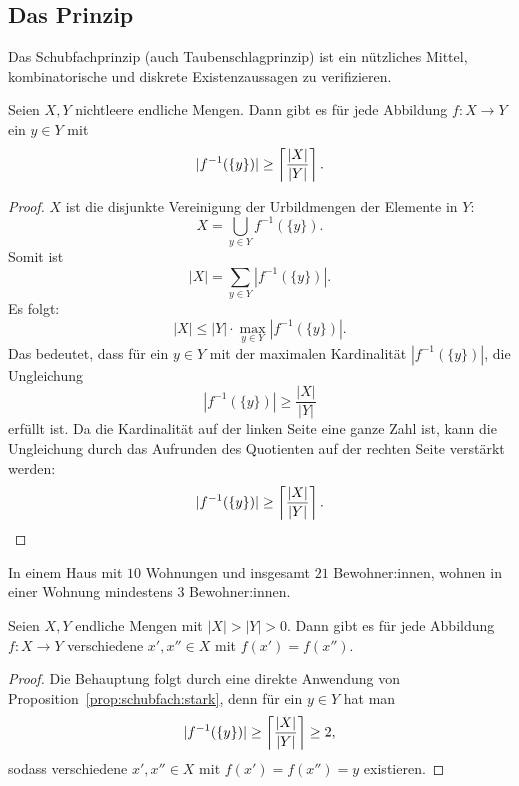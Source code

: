\subsection{Das Prinzip} 

\begin{bem}
	Das Schubfachprinzip (auch Taubenschlagprinzip) ist ein nützliches Mittel, kombinatorische und diskrete  Existenzaussagen zu verifizieren. 
\end{bem} 


\begin{prop} \label{prop:schubfach:stark}
	Seien $X, Y$ nichtleere endliche Mengen. Dann gibt es für jede Abbildung $f: X \to Y$ ein $y \in Y$ mit 
	\[
		|f^{-1} (\{y\})|  \ge  \left\lceil \frac{|X|}{|Y|} \right\rceil .
	\]
\end{prop} 
\begin{proof} $X$ ist die disjunkte Vereinigung der Urbildmengen der Elemente in $Y$:
	\[
			X = \bigcup_{y \in Y} f^{-1}(\{y\}) .
	\]
	Somit ist 
	\[
		|X| = \sum_{y \in Y} | f^{-1}(\{y\}) | .
	\]
	Es folgt: 
	\[
		|X| \le |Y| \cdot \max_{y \in Y} |f^{-1}(\{y\}) |. 
	\]
	Das bedeutet, dass für ein $y \in Y$ mit der maximalen Kardinalität $|f^{-1}(\{y\}) |$, die Ungleichung 
	\[
			|f^{-1}(\{y\})| \ge \frac{|X|}{|Y|}
	\]
	erfüllt ist. Da die Kardinalität auf der linken Seite eine ganze Zahl ist, kann die Ungleichung durch das Aufrunden des Quotienten auf der rechten Seite verstärkt werden: 
	\[
			|f^{-1}(\{y\})| \ge \left\lceil \frac{|X|}{|Y|} \right\rceil.
	\]
\end{proof} 


\begin{bsp}
	In einem Haus mit $10$ Wohnungen und insgesamt $21$ Bewohner:innen, wohnen in einer Wohnung mindestens $3$ Bewohner:innen. 
\end{bsp} 

\begin{kor} 
	Seien $X, Y$ endliche Mengen mit $|X| > |Y| >0$. Dann gibt es für jede Abbildung $f : X \to Y$ verschiedene $x',x''\in X$ mit $f(x')=f(x'')$. 
\end{kor} 
\begin{proof}
	Die Behauptung folgt durch eine direkte Anwendung von Proposition~\ref{prop:schubfach:stark}, denn für ein $y \in Y$ hat man 
	\[
		| f^{-1}(\{y\}) | \ge \left\lceil \frac{|X|}{|Y|} \right\rceil \ge 2,
	\]
	sodass verschiedene $x',x'' \in X$ mit $f(x') = f(x'') =y$ existieren. 
\end{proof} 


